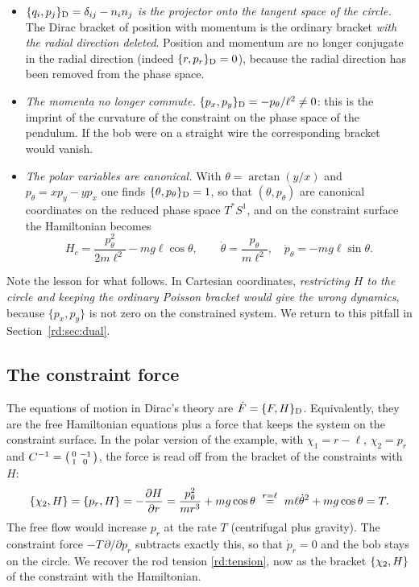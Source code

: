 \begin{itemize}
\item \emph{$\{q_i,p_j\}_{\mathrm D}=\delta_{ij}-n_in_j$ is the projector onto the tangent space of the circle.} The Dirac bracket of position with momentum is the ordinary bracket \emph{with the radial direction deleted}. Position and momentum are no longer conjugate in the radial direction (indeed $\{r,p_r\}_{\mathrm D}=0$), because the radial direction has been removed from the phase space.
\item \emph{The momenta no longer commute.} $\{p_x,p_y\}_{\mathrm D}=-p_\theta/\ell^2\neq0$: this is the imprint of the curvature of the constraint on the phase space of the pendulum. If the bob were on a straight wire the corresponding bracket would vanish.
\item \emph{The polar variables are canonical.} With $\theta=\arctan(y/x)$ and $p_\theta=xp_y-yp_x$ one finds $\{\theta,p_\theta\}_{\mathrm D}=1$, so that $(\theta,p_\theta)$ are canonical coordinates on the reduced phase space $T^*S^1$, and on the constraint surface the Hamiltonian becomes
\[
H_c=\frac{p_\theta^2}{2m\ell^2}-mg\ell\cos\theta ,\qquad \dot\theta=\frac{p_\theta}{m\ell^2},\quad \dot p_\theta=-mg\ell\sin\theta .
\]
\end{itemize}
Note the lesson for what follows. In Cartesian coordinates, \emph{restricting $H$ to the circle and keeping the ordinary Poisson bracket would give the wrong dynamics}, because $\{p_x,p_y\}$ is not zero on the constrained system. We return to this pitfall in Section~\ref{rd:sec:dual}.

\subsection{The constraint force}\label{rd:sec:force}

The equations of motion in Dirac's theory are $\dot F=\{F,H\}_{\mathrm D}$. Equivalently, they are the free Hamiltonian equations plus a force that keeps the system on the constraint surface. In the polar version of the example, with $\chi_1=r-\ell$, $\chi_2=p_r$ and $C^{-1}=\begin{psmallmatrix}0&-1\\1&0\end{psmallmatrix}$, the force is read off from the bracket of the constraints with $H$:
\begin{equation}\label{rd:Tdirac}
\rdpb{\chi_2}H=\rdpb{p_r}H=-\frac{\partial H}{\partial r}=\frac{p_\theta^2}{mr^3}+mg\cos\theta\ \overset{r=\ell}{=}\ m\ell\dot\theta^2+mg\cos\theta=T .
\end{equation}
The free flow would increase $p_r$ at the rate $T$ (centrifugal plus gravity). The constraint force $-T\,\partial/\partial p_r$ subtracts exactly this, so that $\dot p_r=0$ and the bob stays on the circle. We recover the rod tension \eqref{rd:tension}, now as the bracket $\{\chi_2,H\}$ of the constraint with the Hamiltonian.

